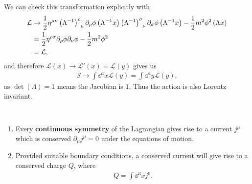 
We can check this transformation explicitly with
\begin{align}
    \mathcal{L} &\to \frac{1}{2}\eta^{\mu \nu} \tensor{\left( \Lambda^{-1} \right) }{^{\rho}_\mu} \partial_\rho \phi \left( \Lambda^{-1} x \right) \tensor{\left( \Lambda^{-1} \right) }{^{\sigma}_{\nu}} \partial_\sigma \phi \left( \Lambda^{-1}x \right) -\frac{1}{2}m^2 \phi^2 \left( \Lambda x \right) \\
    &= \frac{1}{2} \eta^{\rho \sigma} \partial_\rho \phi \partial_\nu \phi - \frac{1}{2} m^2 \phi^2 \\
    &= \mathcal{L} 
,\end{align}
and therefore $\mathcal{L}\left( x \right) \to \mathcal{L}'\left( x \right) = \mathcal{L}\left( y \right) $ gives us
\begin{align}
    S \to \int \dd{^{4}x} \mathcal{L}\left( y \right) = \int \dd{^{4}y} \mathcal{L}\left( y \right) 
,\end{align}
as $\det \left( \Lambda \right) = 1$ means the Jacobian is $1$. Thus the action is also Lorentz invariant.

\begin{theorem}~
    \begin{enumerate}[label=\arabic*)]
        \item Every \textbf{continuous symmetry} of the Lagrangian gives rise to a current $j^{\mu}$ which is conserved $\partial_\mu j^{\mu} = 0$ under the equations of motion.
        \item Provided suitable boundary conditions, a conserved current will give rise to a conserved charge $Q$, where
            \begin{align}
                Q = \int \dd{^3x} j^{0}
            .\end{align}
    \end{enumerate}
\end{theorem}

